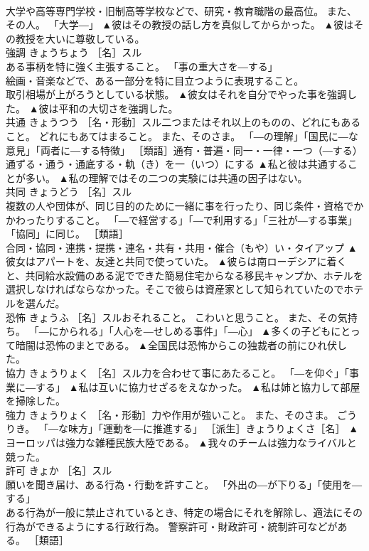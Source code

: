\documentclass[8pt]{extreport}
\begin{document}
\begin{CJK}{UTF8}{min}
\\	大学や高等専門学校・旧制高等学校などで、研究・教育職階の最高位。 また、その人。 「大学―」	▲彼はその教授の話し方を真似してからかった。 ▲彼はその教授を大いに尊敬している。
\\	強調	きょうちょう	［名］スル 
\\	ある事柄を特に強く主張すること。 「事の重大さを―する」 
\\	絵画・音楽などで、ある一部分を特に目立つように表現すること。 
\\	取引相場が上がろうとしている状態。	▲彼女はそれを自分でやった事を強調した。 ▲彼は平和の大切さを強調した。
\\	共通	きょうつう	［名・形動］スル二つまたはそれ以上のものの、どれにもあること。 どれにもあてはまること。 また、そのさま。 「―の理解」「国民に―な意見」「両者に―する特徴」 ［類語］通有・普遍・同一・一律・一つ（―する）通ずる・通う・通底する・軌（き）を一（いつ）にする	▲私と彼は共通することが多い。 ▲私の理解ではその二つの実験には共通の因子はない。
\\	共同	きょうどう	［名］スル 
\\	複数の人や団体が、同じ目的のために一緒に事を行ったり、同じ条件・資格でかかわったりすること。 「―で経営する」「―で利用する」「三社が―する事業」 
\\	「協同」に同じ。 ［類語］
\\	合同・協同・連携・提携・連名・共有・共用・催合（もや）い・タイアップ	▲彼女はアパートを、友達と共同で使っていた。 ▲彼らは南ローデシアに着くと、共同給水設備のある泥でできた簡易住宅からなる移民キャンプか、ホテルを選択しなければならなかった。そこで彼らは資産家として知られていたのでホテルを選んだ。
\\	恐怖	きょうふ	［名］スルおそれること。 こわいと思うこと。 また、その気持ち。 「―にかられる」「人心を―せしめる事件」「―心」	▲多くの子どもにとって暗闇は恐怖のまとである。 ▲全国民は恐怖からこの独裁者の前にひれ伏した。
\\	協力	きょうりょく	［名］スル力を合わせて事にあたること。 「―を仰ぐ」「事業に―する」	▲私は互いに協力せざるをえなかった。 ▲私は姉と協力して部屋を掃除した。
\\	強力	きょうりょく	［名・形動］力や作用が強いこと。 また、そのさま。 ごうりき。 「―な味方」「運動を―に推進する」 ［派生］きょうりょくさ［名］	▲ヨーロッパは強力な雑種民族大陸である。 ▲我々のチームは強力なライバルと競った。
\\	許可	きょか	［名］スル 
\\	願いを聞き届け、ある行為・行動を許すこと。 「外出の―が下りる」「使用を―する」 
\\	ある行為が一般に禁止されているとき、特定の場合にそれを解除し、適法にその行為ができるようにする行政行為。 警察許可・財政許可・統制許可などがある。 ［類語］

\end{CJK}
\end{document}
